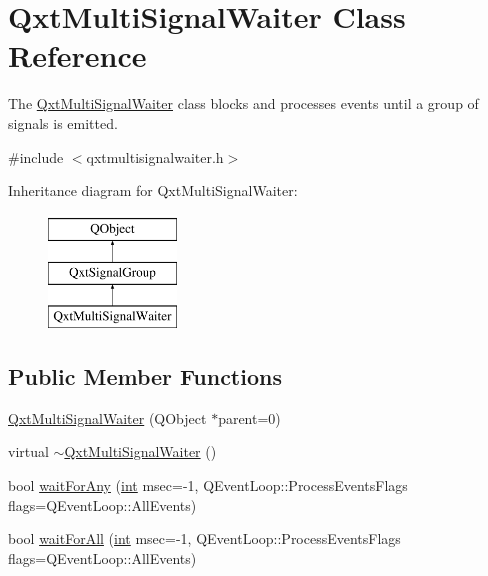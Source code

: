 \hypertarget{class_qxt_multi_signal_waiter}{\section{Qxt\-Multi\-Signal\-Waiter Class Reference}
\label{class_qxt_multi_signal_waiter}
}


The \hyperlink{class_qxt_multi_signal_waiter}{Qxt\-Multi\-Signal\-Waiter} class blocks and processes events until a group of signals is emitted.  




{\ttfamily \#include $<$qxtmultisignalwaiter.\-h$>$}

Inheritance diagram for Qxt\-Multi\-Signal\-Waiter\-:\begin{figure}[H]
\begin{center}
\leavevmode
\includegraphics[height=3.000000cm]{class_qxt_multi_signal_waiter}
\end{center}
\end{figure}
\subsection*{Public Member Functions}
\begin{DoxyCompactItemize}
\item 
\hyperlink{class_qxt_multi_signal_waiter_a9d3bb76060caefad867a480280b06d45}{Qxt\-Multi\-Signal\-Waiter} (Q\-Object $\ast$parent=0)
\item 
virtual \hyperlink{class_qxt_multi_signal_waiter_af41cc2cd662a6c46c5432eb541afd145}{$\sim$\-Qxt\-Multi\-Signal\-Waiter} ()
\item 
bool \hyperlink{class_qxt_multi_signal_waiter_a41aabd817915f343ecde6505c6ccf55d}{wait\-For\-Any} (\hyperlink{ioapi_8h_a787fa3cf048117ba7123753c1e74fcd6}{int} msec=-\/1, Q\-Event\-Loop\-::\-Process\-Events\-Flags flags=Q\-Event\-Loop\-::\-All\-Events)
\item 
bool \hyperlink{class_qxt_multi_signal_waiter_a6cb02fd64ef57ab7bbf6a5e81c4147c9}{wait\-For\-All} (\hyperlink{ioapi_8h_a787fa3cf048117ba7123753c1e74fcd6}{int} msec=-\/1, Q\-Event\-Loop\-::\-Process\-Events\-Flags flags=Q\-Event\-Loop\-::\-All\-Events)
\end{DoxyCompactItemize}
